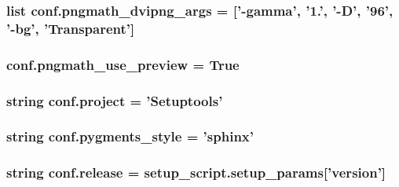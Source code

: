 \subsubsection[{pngmath\+\_\+dvipng\+\_\+args}]{\setlength{\rightskip}{0pt plus 5cm}list conf.\+pngmath\+\_\+dvipng\+\_\+args = \mbox{[}'-\/{\bf gamma}', '1.', '-\/{\bf D}', '96', '-\/bg', 'Transparent'\mbox{]}}\label{namespaceconf_ab3a89593e7b7c63c11c3921f4f2aad4d}
\hypertarget{namespaceconf_a961bac4a1aae8c9a69ef34c1b0d92e67}{}
\subsubsection[{pngmath\+\_\+use\+\_\+preview}]{\setlength{\rightskip}{0pt plus 5cm}conf.\+pngmath\+\_\+use\+\_\+preview = {\bf True}}\label{namespaceconf_a961bac4a1aae8c9a69ef34c1b0d92e67}
\hypertarget{namespaceconf_aa2c6aefbed1597a70cfb45a760e5977c}{}
\subsubsection[{project}]{\setlength{\rightskip}{0pt plus 5cm}string conf.\+project = 'Setuptools'}\label{namespaceconf_aa2c6aefbed1597a70cfb45a760e5977c}
\hypertarget{namespaceconf_afa4e4ed164119ef5f4656e9554ed1f1b}{}
\subsubsection[{pygments\+\_\+style}]{\setlength{\rightskip}{0pt plus 5cm}string conf.\+pygments\+\_\+style = 'sphinx'}\label{namespaceconf_afa4e4ed164119ef5f4656e9554ed1f1b}
\hypertarget{namespaceconf_a90a599726178800ad5a42f6bc2cd5208}{}
\subsubsection[{release}]{\setlength{\rightskip}{0pt plus 5cm}string conf.\+release = setup\+\_\+script.\+setup\+\_\+params\mbox{[}'{\bf version}'\mbox{]}}\label{namespaceconf_a90a599726178800ad5a42f6bc2cd5208}
\hypertarget{namespaceconf_a8ad36ea49cb7ae6ec9f6f3a7e9deaa0e}{}
